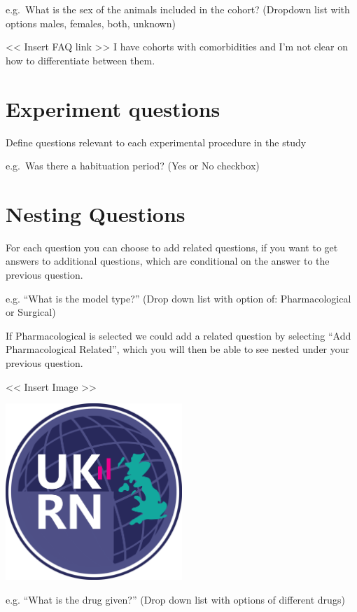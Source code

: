 \documentclass[]{book}
\begin{document}
e.g.~What is the sex of the animals included in the cohort? (Dropdown
list with options males, females, both, unknown)

\textless{}\textless{} Insert FAQ link \textgreater{}\textgreater{} I
have cohorts with comorbidities and I'm not clear on how to
differentiate between them.

\section{Experiment questions}\label{experiment-questions}

Define questions relevant to each experimental procedure in the study

e.g.~Was there a habituation period? (Yes or No checkbox)

\section{Nesting Questions}\label{nesting-questions}

For each question you can choose to add related questions, if you want
to get answers to additional questions, which are conditional on the
answer to the previous question.

e.g. ``What is the model type?'' (Drop down list with option of:
Pharmacological or Surgical)

If Pharmacological is selected we could add a related question by
selecting ``Add Pharmacological Related'', which you will then be able
to see nested under your previous question.

\textless{}\textless{} Insert Image \textgreater{}\textgreater{}

\includegraphics[width=0.50000\textwidth,height=0.50000\textwidth]{figs/evidence-triangle.png}

e.g. ``What is the drug given?'' (Drop down list with options of
different drugs)
\end{document}

